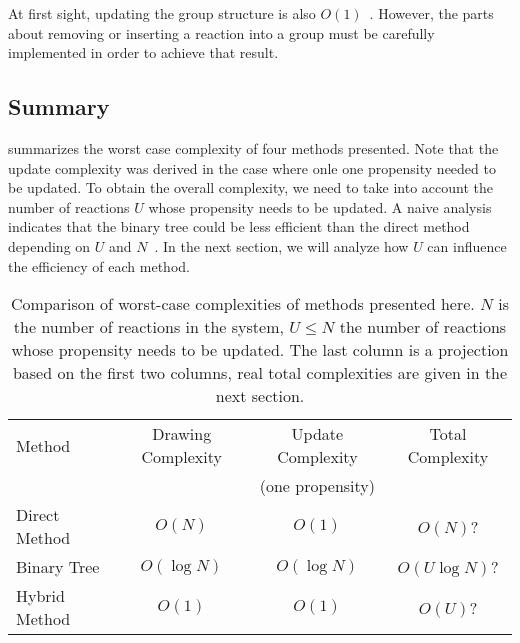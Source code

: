 At first sight, updating the group structure is also $O(1)$~. However, the parts about removing or inserting a reaction into a group must be carefully implemented in order to achieve that result.

\subsection {Summary}

 summarizes the worst case complexity of four methods presented. Note that the update complexity was derived in the case where onle one propensity needed to be updated. To obtain the overall complexity, we need to take into account the number of reactions $U$ whose propensity needs to be updated. A naive analysis indicates that the binary tree could be less efficient than the direct method depending on $U$ and $N$~. In the next section, we will analyze how $U$ can influence the efficiency of each method.

\begin{table}[!h]
  \centering
  \begin{tabular}{|l|c|c|c|}
    \hline
    Method & Drawing Complexity & Update Complexity & Total Complexity\\
           &                    & (one propensity) & \\
    \hline
    Direct Method & $O(N)$ & $O(1)$ & $O(N)$?\\
    Binary Tree & $O(\log N)$ & $O(\log N)$ & $O(U\log N)$?\\
    Hybrid Method & $O(1)$ & $O(1)$ & $O(U)$?\\
    \hline
  \end{tabular}
  \caption{Comparison of worst-case complexities of methods presented here. $N$ is the number of reactions in the system, $U \leq N$ the number of reactions whose propensity needs to be updated. The last column is a projection based on the first two columns, real total complexities are given in the next section.}
  \label{tab:selection_summary}
\end{table}	
